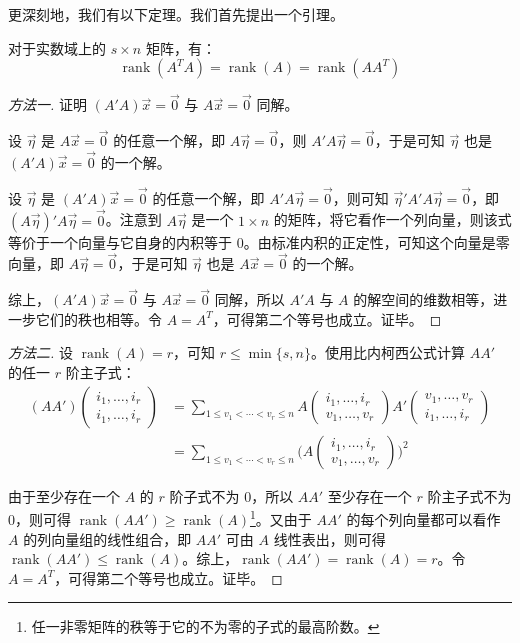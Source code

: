 更深刻地，我们有以下定理。我们首先提出一个引理。

\begin{theorem}
	对于实数域上的 $s \times n$ 矩阵，有：
	$$
	\operatorname{rank}(A^T A) = \operatorname{rank}(A) = \operatorname{rank}(AA^T)
	$$
\end{theorem}

\begin{proof}[方法一]
	证明 $(A'A) \vec x = \vec 0$ 与 $A \vec x = \vec 0$ 同解。

	设 $\vec \eta$ 是 $A \vec x = \vec 0$ 的任意一个解，即 $A \vec \eta = \vec 0$，则 $A'A \vec \eta = \vec 0$，于是可知 $\vec \eta$ 也是 $(A'A) \vec x = \vec 0$ 的一个解。

	设 $\vec \eta$ 是 $(A'A) \vec x = \vec 0$ 的任意一个解，即 $A' A \vec \eta = \vec 0$，则可知 $\vec \eta' A' A \vec \eta = \vec 0$，即 $(A \vec \eta)' A \vec \eta = \vec 0$。注意到 $A \vec \eta$ 是一个 $1 \times n$ 的矩阵，将它看作一个列向量，则该式等价于一个向量与它自身的内积等于 $0$。由标准内积的正定性，可知这个向量是零向量，即 $A \vec \eta = \vec 0$，于是可知 $\vec \eta$ 也是 $A \vec x = \vec 0$ 的一个解。

	综上，$(A'A)\vec x = \vec 0$ 与 $A \vec x = \vec 0$ 同解，所以 $A'A$ 与 $A$ 的解空间的维数相等，进一步它们的秩也相等。令 $A = A^T$，可得第二个等号也成立。证毕。
\end{proof}

\begin{proof}[方法二]
	设 $\operatorname{rank}(A) = r$，可知 $r \le \min \{s, n\}$。使用比内柯西公式计算 $AA'$ 的任一 $r$ 阶主子式：
	$$
	\begin{aligned}
		(AA') \begin{pmatrix} i_1, \ldots, i_r \\ i_1, \ldots, i_r \end{pmatrix} &= \sum\limits_{1 \le v_1 < \cdots < v_r \le n} A \begin{pmatrix} i_1, \ldots, i_r \\ v_1, \ldots, v_r \end{pmatrix} A' \begin{pmatrix} v_1, \ldots, v_r \\ i_1, \ldots, i_r \end{pmatrix}
		\\&=
		\sum\limits_{1 \le v_1 < \cdots < v_r \le n} \Biggl( A \begin{pmatrix} i_1, \ldots, i_r \\ v_1, \ldots, v_r \end{pmatrix} \Biggr)^2
	\end{aligned}
	$$

	由于至少存在一个 $A$ 的 $r$ 阶子式不为 $0$，所以 $AA'$ 至少存在一个 $r$ 阶主子式不为 $0$，则可得 $\operatorname{rank}(AA') \ge \operatorname{rank}(A)$\footnote{任一非零矩阵的秩等于它的不为零的子式的最高阶数。}。又由于 $AA'$ 的每个列向量都可以看作 $A$ 的列向量组的线性组合，即 $AA'$ 可由 $A$ 线性表出，则可得 $\operatorname{rank}(AA') \le \operatorname{rank}(A)$。综上，$\operatorname{rank}(AA') = \operatorname{rank}(A) = r$。令 $A = A^T$，可得第二个等号也成立。证毕。
\end{proof}


